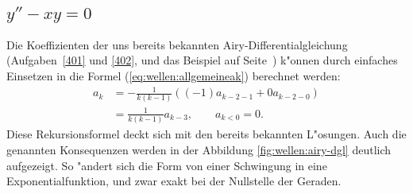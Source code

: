 \subsection{\texorpdfstring{$y''-xy = 0$}{y''-xy = 0}}
Die Koeffizienten der uns bereits bekannten Airy-Differentialgleichung
(Aufgaben~\ref{401} und \ref{402}, und das Beispiel auf
Seite~\pageref{komplex:airydgl})
k"onnen 
durch einfaches Einsetzen in die Formel (\ref{eq:wellen:allgemeineak}) 
berechnet werden:
\begin{equation*}
	\begin{split}
		a_k &= -\frac{1}{k(k-1)} ((-1) a_{k-2-1} + 
		0 a_{k-2-0})
		\\
		&= \frac{1}{k(k-1)} a_{k-3}, \qquad a_{k < 0} = 0.
	\end{split}
\end{equation*}
Diese Rekursionsformel deckt sich mit den bereits bekannten L"osungen.
Auch die genannten Konsequenzen werden in der Abbildung 
\ref{fig:wellen:airy-dgl} deutlich aufgezeigt. So "andert sich die Form von 
einer Schwingung in eine Exponentialfunktion, und zwar exakt bei der Nullstelle 
der Geraden.

